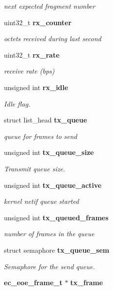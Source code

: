 \begin{DoxyCompactItemize}
\begin{DoxyCompactList}\small\item\em next expected fragment number \end{DoxyCompactList}\item 
uint32\-\_\-t {\bf rx\-\_\-counter}\label{structec__eoe_a94ade8d6e6250de7d04b86160b83c22c}

\begin{DoxyCompactList}\small\item\em octets received during last second \end{DoxyCompactList}\item 
uint32\-\_\-t {\bf rx\-\_\-rate}\label{structec__eoe_a1062493d151d4b2ad4e0392673ad1507}

\begin{DoxyCompactList}\small\item\em receive rate (bps) \end{DoxyCompactList}\item 
unsigned int {\bf rx\-\_\-idle}
\begin{DoxyCompactList}\small\item\em Idle flag. \end{DoxyCompactList}\item 
struct list\-\_\-head {\bf tx\-\_\-queue}\label{structec__eoe_afd6bcfa6f1ad2bfb371439776b2ca8a9}

\begin{DoxyCompactList}\small\item\em queue for frames to send \end{DoxyCompactList}\item 
unsigned int {\bf tx\-\_\-queue\-\_\-size}
\begin{DoxyCompactList}\small\item\em Transmit queue size. \end{DoxyCompactList}\item 
unsigned int {\bf tx\-\_\-queue\-\_\-active}\label{structec__eoe_a167ab3458420a60abec520dd0c73e5d5}

\begin{DoxyCompactList}\small\item\em kernel netif queue started \end{DoxyCompactList}\item 
unsigned int {\bf tx\-\_\-queued\-\_\-frames}\label{structec__eoe_a3ec0e5dc97f984769403f00230e53f03}

\begin{DoxyCompactList}\small\item\em number of frames in the queue \end{DoxyCompactList}\item 
struct semaphore {\bf tx\-\_\-queue\-\_\-sem}
\begin{DoxyCompactList}\small\item\em Semaphore for the send queue. \end{DoxyCompactList}\item 
{\bf ec\-\_\-eoe\-\_\-frame\-\_\-t} $\ast$ {\bf tx\-\_\-frame}\label{structec__eoe_a5f814555b215fa648246d3e4b8952db4}


\end{DoxyCompactItemize}
